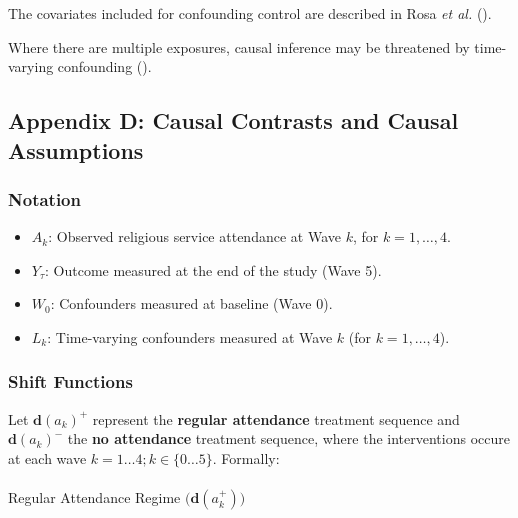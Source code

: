 \documentclass[
  single column]{article}
\makeatletter
\let\oldparagraph\paragraph
\renewcommand{\paragraph}{
    \@ifstar
      \xxxParagraphStar
      \xxxParagraphNoStar
  }
\newcommand{\xxxParagraphStar}[1]{\oldparagraph*{#1}\mbox{}}
\newcommand{\xxxParagraphNoStar}[1]{\oldparagraph{#1}\mbox{}}
\providecommand{\tightlist}{%
  \setlength{\itemsep}{0pt}\setlength{\parskip}{0pt}}\usepackage{longtable,booktabs,array}
\makeatother
\begin{document}
The covariates included for confounding control are described in Rosa
\emph{et al.} ().

Where there are multiple exposures, causal inference may be threatened
by time-varying confounding
().

\newpage{}

\subsection{Appendix D: Causal Contrasts and Causal
Assumptions}\label{appendix-assumptions}

\subsubsection{Notation}\label{notation}

\begin{itemize}
\tightlist
\item
  \(A_k\): Observed religious service attendance at Wave \(k\), for
  \(k = 1, \dots, 4\).\\
\item
  \(Y_\tau\): Outcome measured at the end of the study (Wave 5).\\
\item
  \(W_0\): Confounders measured at baseline (Wave 0).\\
\item
  \(L_k\): Time-varying confounders measured at Wave \(k\) (for
  \(k = 1, \dots, 4\)).
\end{itemize}

\subsubsection{Shift Functions}\label{shift-functions}

Let \(\boldsymbol{\text{d}}(a_k)^+\) represent the \textbf{regular
attendance} treatment sequence and \(\boldsymbol{\text{d}}(a_k)^-\) the
\textbf{no attendance} treatment sequence, where the interventions
occure at each wave \(k = 1\dots 4; k\in \{0\dots 5\}\). Formally:

\paragraph{\texorpdfstring{Regular Attendance Regime
\(\bigl(\boldsymbol{\text{d}}(a_k^+)\bigr)\)}{Regular Attendance Regime \textbackslash bigl(\textbackslash boldsymbol\{\textbackslash text\{d\}\}(a\_k\^{}+)\textbackslash bigr)}}\label{regular-attendance-regime-biglboldsymboltextda_kbigr}
\end{document}
